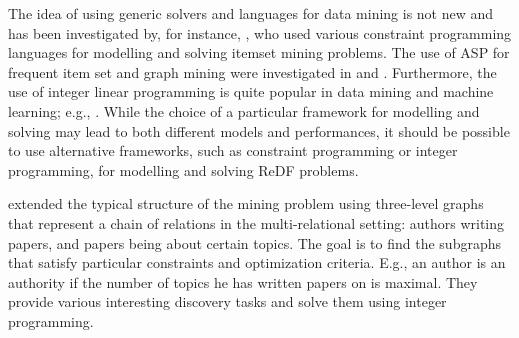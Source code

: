 The idea of using generic solvers and languages for data mining is not new and has been investigated by, for instance, \cite{GunsAIJ12,miningZinc,DBLP:conf/sac/MetivierBCKL12},
who used various constraint programming languages for modelling and solving itemset mining problems.  
The use of ASP for frequent item set and graph mining were investigated in \cite{DBLP:conf/lpnmr/Jarvisalo11} and \cite{ilp_graph_mining}.  
Furthermore, the use of 
integer linear programming is quite popular in data mining and machine learning; e.g., \cite{DBLP:conf/aaai/ChangRRR08}.
While the choice of a particular framework for modelling and solving may lead to both different models and performances, it should be possible to use alternative frameworks, such as constraint programming or integer programming, for modelling and solving ReDF problems. 

\cite{miningchains} extended the typical structure of the mining problem using three-level graphs that represent a chain of relations in the multi-relational setting: authors writing papers, and papers being about certain topics. The goal is to find the subgraphs that satisfy particular constraints and optimization criteria.
E.g., an author is an authority  if the number of topics he has written papers on is maximal. They provide various interesting discovery tasks 
and solve them using integer programming.



